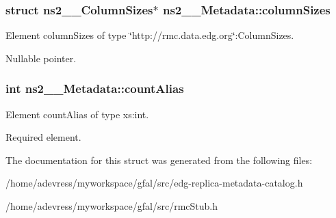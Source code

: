 \subsubsection{\setlength{\rightskip}{0pt plus 5cm}struct \bf{ns2\_\-\_\-Column\-Sizes}$\ast$ \bf{ns2\_\-\_\-Metadata::column\-Sizes}}\label{structns2____Metadata_de394d8161c595d9c7e0c546059a39e9}


Element column\-Sizes of type \char`\"{}http://rmc.data.edg.org\char`\"{}:Column\-Sizes. 

Nullable pointer. 
\subsubsection{\setlength{\rightskip}{0pt plus 5cm}int \bf{ns2\_\-\_\-Metadata::count\-Alias}}\label{structns2____Metadata_1e5052c3dba0c266680ab5e9977e2f6b}


Element count\-Alias of type xs:int. 

Required element. 

The documentation for this struct was generated from the following files:\begin{CompactItemize}
\item 
/home/adevress/myworkspace/gfal/src/edg-replica-metadata-catalog.h\item 
/home/adevress/myworkspace/gfal/src/rmc\-Stub.h\end{CompactItemize}

